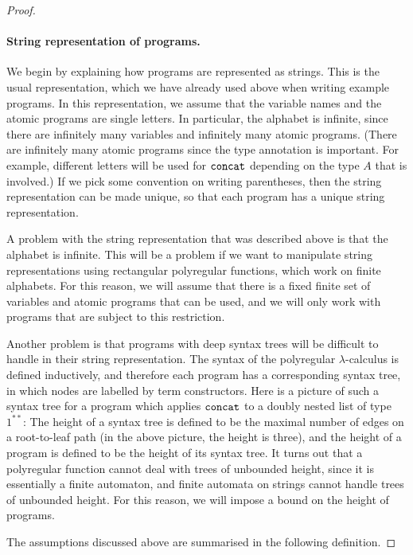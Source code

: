 \begin{proof}
    \paragraph*{String representation of programs.} We begin by explaining how programs are represented as strings. This is the usual representation, which we have already used above when writing example programs. In this representation, we assume that the variable names and the atomic programs are single letters. In particular, the alphabet is infinite, since there are infinitely many variables and infinitely many atomic programs.  (There are infinitely many atomic programs  since the type annotation is important. For example, different letters will be used for $\mathtt{concat}$ depending on the type $A$ that is involved.) If we pick some convention on writing parentheses, then the string representation can be made unique, so that each program has a unique string representation.
    
    A problem with the string representation that was described above is that the alphabet is infinite. This will be a problem if we want to manipulate string representations using rectangular polyregular functions, which work on finite alphabets. For this reason, we will assume that there is a fixed finite set of variables and atomic programs that can be used, and we will only work with programs that are subject to this restriction. 
    
    Another problem is that programs with deep syntax trees will be difficult to handle in their string representation. The syntax of the polyregular $\lambda$-calculus is defined inductively, and therefore each program has a corresponding syntax tree, in which nodes are labelled by term constructors. Here is a picture of such a syntax tree for a program which applies $\mathtt{concat}$ to a doubly nested list of type $1^{**}$:
    The height of a syntax tree is defined to be the maximal number of edges on a root-to-leaf path (in the above picture, the height is three), and the height of a program is defined to be the height of its syntax tree.
    It turns out that a polyregular function cannot  deal with trees of unbounded height, since it is essentially a finite automaton, and finite automata on strings cannot handle trees of unbounded height. For this reason, we will impose a bound on the height of programs. 

The assumptions discussed above are summarised  in the following definition.


\end{proof}
